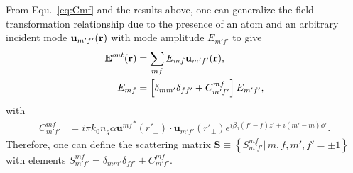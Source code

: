 \documentclass[preprint,aps,pra,onecolumn]{revtex4-1} %
\begin{document}
From Equ.~\eqref{eq:Cmf} and the results above, one can generalize the field transformation relationship due to the presence of an atom and an arbitrary incident mode $\mathbf{u}_{m'f'}(\mathbf{r})$ with mode amplitude $E_{m'f'}$ to give
\begin{align}
\mathbf{E}^{out}(\mathbf{r}) &= \sum_{mf}E_{mf}\mathbf{u}_{m'f'}(\mathbf{r}),\\
E_{mf} &= \left[\delta_{mm'}\delta_{ff'}+C_{m'f'}^{mf}\right]E_{m'f'},
\end{align}
with 
\begin{align}
C^{mf}_{m'f'}
&= i\pi k_0 n_g\alpha  {\mathbf{u}^{mf}}^*(r'_{\!\perp})\cdot \mathbf{u}_{m'f'}(r'_{\!\perp})e^{i\beta_0 (f'-f)z'+i(m'-m)\phi'}.\label{eq:Cmfmf}
\end{align}
Therefore, one can define the scattering matrix $\mathbf{S}\equiv \left\{S^{mf}_{m'f'}|\,m,f,m',f'=\pm 1 \right\}$ with elements $S^{mf}_{m'f'}=\delta_{mm'}\delta_{ff'}+C_{m'f'}^{mf}$. 
\end{document}
